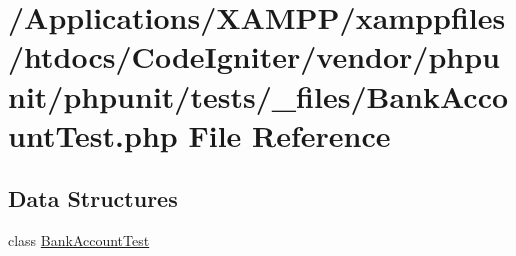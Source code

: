 \hypertarget{phpunit_2tests_2__files_2_bank_account_test_8php}{}\section{/\+Applications/\+X\+A\+M\+P\+P/xamppfiles/htdocs/\+Code\+Igniter/vendor/phpunit/phpunit/tests/\+\_\+files/\+Bank\+Account\+Test.php File Reference}
\label{phpunit_2tests_2__files_2_bank_account_test_8php}
\subsection*{Data Structures}
\begin{DoxyCompactItemize}
\item 
class \mbox{\hyperlink{class_bank_account_test}{Bank\+Account\+Test}}
\end{DoxyCompactItemize}
